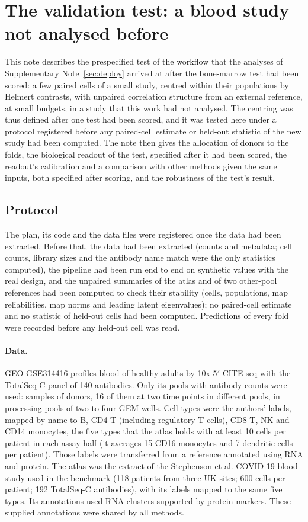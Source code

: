 \section{The validation test: a blood study not analysed before}\label{sec:val}
This note describes the prespecified test of the workflow that the analyses of Supplementary Note~\ref{sec:deploy} arrived at after the bone-marrow test had been scored: a few paired cells of a small study, centred within their populations by Helmert contrasts, with unpaired correlation structure from an external reference, at small budgets, in a study that this work had not analysed. The centring was thus defined after one test had been scored, and it was tested here under a protocol registered before any paired-cell estimate or held-out statistic of the new study had been computed. The note then gives the allocation of donors to the folds, the biological readout of the test, specified after it had been scored, the readout's calibration and a comparison with other methods given the same inputs, both specified after scoring, and the robustness of the test's result.

\subsection*{Protocol}
The plan, its code and the data files were registered once the data had been extracted. Before that, the data had been extracted (counts and metadata; cell counts, library sizes and the antibody name match were the only statistics computed), the pipeline had been run end to end on synthetic values with the real design, and the unpaired summaries of the atlas and of two other-pool references had been computed to check their stability (cells, populations, map reliabilities, map norms and leading latent eigenvalues); no paired-cell estimate and no statistic of held-out cells had been computed. Predictions of every fold were recorded before any held-out cell was read.

\paragraph{Data.} GEO GSE314416\cite{babdor2026} profiles blood of healthy adults by 10x 5$'$ CITE-seq with the TotalSeq-C panel of 140 antibodies. Only its pools with antibody counts were used: \VlNFolds{} samples of \VlNDonors{} donors, 16 of them at two time points in different pools, in \VlNPools{} processing pools of two to four GEM wells. Cell types were the authors' labels, mapped by name to B, CD4 T (including regulatory T cells), CD8 T, NK and CD14 monocytes, the five types that the atlas holds with at least 10 cells per patient in each assay half (it averages 15 CD16 monocytes and 7 dendritic cells per patient). Those labels were transferred from a reference annotated using RNA and protein. The atlas was the extract of the Stephenson et al. COVID-19 blood study\cite{stephenson2021} used in the benchmark (118 patients from three UK sites; 600 cells per patient; 192 TotalSeq-C antibodies), with its labels mapped to the same five types. Its annotations used RNA clusters supported by protein markers. These supplied annotations were shared by all methods.

